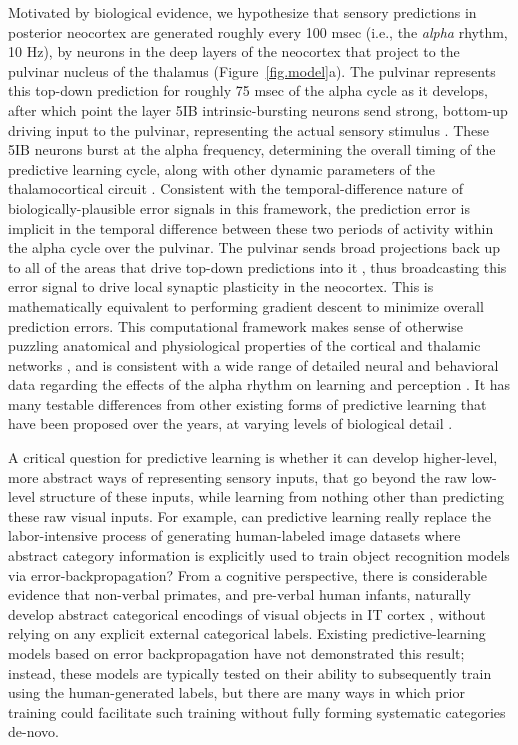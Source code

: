 \documentclass[11pt,twoside]{article}
\newif\myifpdf
\begin{document}
Motivated by biological evidence, we hypothesize that sensory predictions in posterior neocortex are generated roughly every 100 msec (i.e., the {\em alpha} rhythm, 10 Hz), by neurons in the deep layers of the neocortex that project to the pulvinar nucleus of the thalamus (Figure~\ref{fig.model}a).  The pulvinar represents this top-down prediction for roughly 75 msec of the alpha cycle as it develops, after which point the layer 5IB intrinsic-bursting neurons send strong, bottom-up driving input to the pulvinar, representing the actual sensory stimulus \cite{ShermanGuillery06}.  These 5IB neurons burst at the alpha frequency, determining the overall timing of the predictive learning cycle, along with other dynamic parameters of the thalamocortical circuit \cite{LorinczKekesiJuhaszEtAl09,FranceschettiGuatteoPanzicaEtAl95,SaalmannPinskWangEtAl12}.  Consistent with the temporal-difference nature of biologically-plausible error signals in this framework, the prediction error is implicit in the temporal difference between these two periods of activity within the alpha cycle over the pulvinar.  The pulvinar sends broad projections back up to all of the areas that drive top-down predictions into it \cite{Shipp03,Mumford91}, thus broadcasting this error signal to drive local synaptic plasticity in the neocortex. This is mathematically equivalent to performing gradient descent to minimize overall prediction errors.  This computational framework makes sense of otherwise puzzling anatomical and physiological properties of the cortical and thalamic networks \cite{ShermanGuillery06}, and is consistent with a wide range of detailed neural and behavioral data regarding the effects of the alpha rhythm on learning and perception \cite{BuffaloFriesLandmanEtAl11,VanRullenKoch03,JensenBonnefondVanRullen12,FiebelkornKastner19}.  It has many testable differences from other existing forms of predictive learning that have been proposed over the years, at varying levels of biological detail \cite{Mumford92,RaoBallard99,KawatoHayakawaInui93,Friston05}.

A critical question for predictive learning is whether it can develop higher-level, more abstract ways of representing sensory inputs, that go beyond the raw low-level structure of these inputs, while learning from nothing other than predicting these raw visual inputs.  For example, can predictive learning really replace the labor-intensive process of generating human-labeled image datasets where abstract category information is explicitly used to train object recognition models via error-backpropagation?  From a cognitive perspective, there is considerable evidence that non-verbal primates, and pre-verbal human infants, naturally develop abstract categorical encodings of visual objects in IT cortex \cite{CadieuHongYaminsEtAl14}, without relying on any explicit external categorical labels.  Existing predictive-learning models based on error backpropagation \cite{LotterKreimanCox16} have not demonstrated this result; instead, these models are typically tested on their ability to subsequently train using the human-generated labels, but there are many ways in which prior training could facilitate such training without fully forming systematic categories de-novo.
\end{document}

